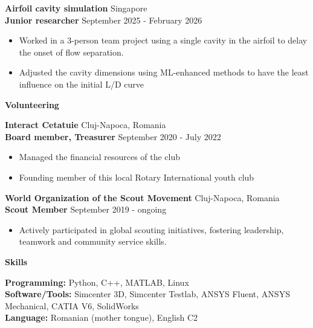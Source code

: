 \documentclass[11pt]{article}
\newcommand{\cvsection}[1]{%
  \vspace{16pt}%
  \centerline{\textbf{#1}}%
  \vspace{8pt}%
}
\newcommand{\cvrole}[4]{%
  \textbf{#1} \hfill #2 \\
  \textbf{#3} \hfill #4\par
}
\newcommand{\cvgap}{\vspace{0.7em}}
\begin{document}
\cvrole{Airfoil cavity simulation}{Singapore}{Junior researcher}{September 2025 - February 2026}
\begin{itemize}
  \item Worked in a 3-person team project using a single cavity in the airfoil to delay the onset of flow separation.
  \item Adjusted the cavity dimensions using ML-enhanced methods to have the least influence on the initial L/D curve
\end{itemize}

\cvsection{Volunteering}

\cvrole{Interact Cetatuie}{Cluj-Napoca, Romania}{Board member, Treasurer}{September 2020 - July 2022}
\begin{itemize}
  \item Managed the financial resources of the club
  \item Founding member of this local Rotary International youth club
\end{itemize}
\cvgap

\cvrole{World Organization of the Scout Movement}{Cluj-Napoca, Romania}{Scout Member}{September 2019 - ongoing}
\begin{itemize}
  \item Actively participated in global scouting initiatives, fostering leadership, teamwork and community service skills.
\end{itemize}

\vspace{-8pt}
\cvsection{Skills}

\textbf{Programming:} Python, C++, MATLAB, Linux \\
\textbf{Software/Tools:} Simcenter 3D, Simcenter Testlab, ANSYS Fluent, ANSYS Mechanical, CATIA V6, SolidWorks \\
\textbf{Language:} Romanian (mother tongue), English C2
\end{document}
